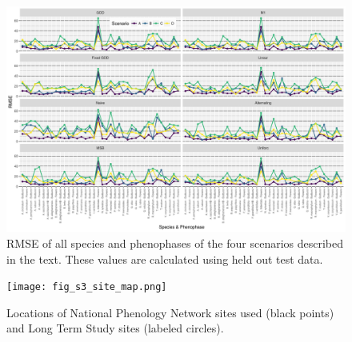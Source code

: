 \documentclass[fleqn,10pt,lineno]{wlpeerj} %
\begin{document}
\begin{figure}
	\centering
		\includegraphics[width=1\textwidth]{supplement_scenario_absolute_rmse.png}
	\caption{RMSE of all species and phenophases of the four scenarios described in the text. These values are calculated using held out test data.}
\end{figure}

\begin{figure}
	\centering
		\texttt{[image: fig\_s3\_site\_map.png]}
	\caption{Locations of National Phenology Network sites used (black points) and Long Term Study sites (labeled circles).}
\end{figure}
\end{document}
